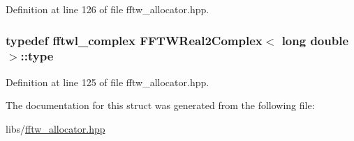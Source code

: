 Definition at line 126 of file fftw\-\_\-allocator.\-hpp.

\hypertarget{struct_f_f_t_w_real2_complex_3_01long_01double_01_4_a327f3e85d7a512030721ee4aedd6a7af}{
\subsubsection[{type}]{\setlength{\rightskip}{0pt plus 5cm}typedef fftwl\-\_\-complex {\bf F\-F\-T\-W\-Real2\-Complex}$<$ long double $>$\-::{\bf type}}}\label{struct_f_f_t_w_real2_complex_3_01long_01double_01_4_a327f3e85d7a512030721ee4aedd6a7af}


Definition at line 125 of file fftw\-\_\-allocator.\-hpp.



The documentation for this struct was generated from the following file\-:\begin{DoxyCompactItemize}
\item 
libs/\hyperlink{fftw__allocator_8hpp}{fftw\-\_\-allocator.\-hpp}\end{DoxyCompactItemize}

